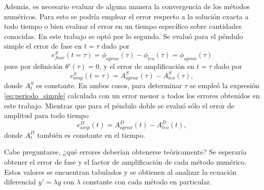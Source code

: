 \documentclass[aps,prb,twocolumn,superscriptaddress,floatfix,longbibliography]{revtex4-2}
\newcounter{para}
\begin{document}
Además, es necesario evaluar de alguna manera la convergencia de los métodos numéricos. Para esto se podría emplear el error respecto a la solución exacta a todo tiempo o bien evaluar el error en un tiempo específico sobre cantidades conocidas. En este trabajo se optó por lo segundo. Se evaluó para el péndulo simple el error de fase en $t = \tau$ dado por
\begin{equation}
  e^S_{fase}(t = \tau) = \phi_{aprox}(\tau) - \phi_{teo}(\tau) = \phi_{aprox}(\tau)
  \label{eq:simple_e_fase}
\end{equation}
pues por definición $\theta'(\tau) = 0$, y el error de amplificación en $t = \tau$ dado por
\begin{equation}
  e^S_{amp}(t = \tau) = A^S_{aprox}(\tau) - A^S_{teo}(\tau),
  \label{eq:simple_e_amp}
\end{equation}
donde $A^S_{t}$ es constante. En ambos casos, para determinar $\tau$ se empleó la expresión \ref{eq:periodo_simple} calculada con un error menor a todos los errores obtenidos en este trabajo. Mientras que para el péndulo doble se evaluó sólo el error de amplitud para todo tiempo
\begin{equation}
  e^D_{amp}(t) = A^D_{aprox}(t) - A^D_{teo}(t),
  \label{eq:doble_e_amp}
\end{equation}
donde $A^D_{t}$ también es constante en el tiempo.

Cabe preguntarse, ¿qué errores deberían obtenerse teóricamente? Se esperaría obtener el error de fase y el factor de amplificación de cada método numérico. Estos valores se encuentran tabulados y se obtienen al analizar la ecuación diferencial $y' = \lambda y$ con $\lambda$ constante con cada método en particular.
\end{document}
